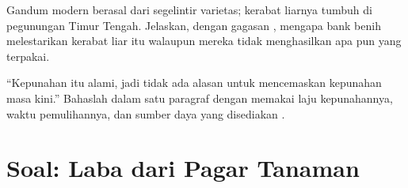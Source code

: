 \begin{exercise}[$\star\star\star$]\label{exo:g10:biodiversity-scales:14}
Gandum modern berasal dari segelintir varietas; kerabat liarnya tumbuh
di pegunungan Timur Tengah. Jelaskan, dengan gagasan , mengapa bank benih melestarikan kerabat liar itu walaupun
mereka tidak menghasilkan apa pun yang terpakai.
\end{exercise}

\begin{exercise}[$\star\star\star$]\label{exo:g10:biodiversity-scales:15}
``Kepunahan itu alami, jadi tidak ada alasan untuk mencemaskan
kepunahan masa kini.'' Bahaslah dalam satu paragraf dengan memakai laju
kepunahannya, waktu pemulihannya, dan sumber daya yang disediakan
.
\end{exercise}

\section{Soal: Laba dari Pagar Tanaman}

